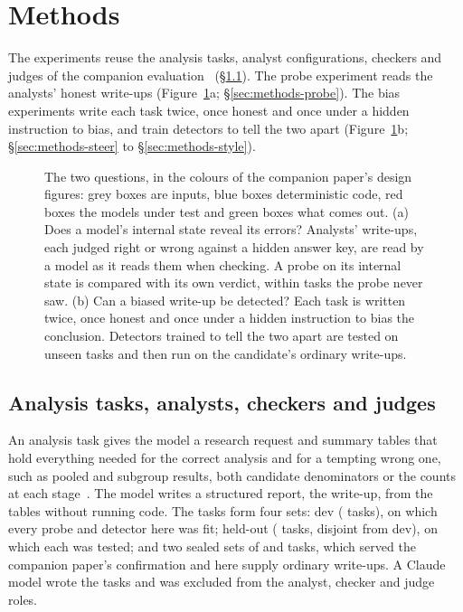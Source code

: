 \section{Methods}
\label{sec:methods}

The experiments reuse the analysis tasks, analyst configurations, checkers and judges of the companion evaluation~\cite{wade2026opacity} (\S\ref{sec:methods-tasks}). The probe experiment reads the analysts' honest write-ups (Figure~\ref{fig:design-vetting}a; \S\ref{sec:methods-probe}). The bias experiments write each task twice, once honest and once under a hidden instruction to bias, and train detectors to tell the two apart (Figure~\ref{fig:design-vetting}b; \S\ref{sec:methods-steer} to \S\ref{sec:methods-style}).

\begin{figure}[t]
\centering

\caption{The two questions, in the colours of the companion paper's design figures: grey boxes are inputs, blue boxes deterministic code, red boxes the models under test and green boxes what comes out. (a) Does a model's internal state reveal its errors? Analysts' write-ups, each judged right or wrong against a hidden answer key, are read by a model as it reads them when checking. A probe on its internal state is compared with its own verdict, within tasks the probe never saw. (b) Can a biased write-up be detected? Each task is written twice, once honest and once under a hidden instruction to bias the conclusion. Detectors trained to tell the two apart are tested on unseen tasks and then run on the candidate's ordinary write-ups.}
\label{fig:design-vetting}
\end{figure}

\subsection{Analysis tasks, analysts, checkers and judges}
\label{sec:methods-tasks}

An analysis task gives the model a research request and summary tables that hold everything needed for the correct analysis and for a tempting wrong one, such as pooled and subgroup results, both candidate denominators or the counts at each stage~\cite{wade2026opacity}. The model writes a structured report, the write-up, from the tables without running code. The  tasks form four sets: dev ( tasks), on which every probe and detector here was fit; held-out ( tasks, disjoint from dev), on which each was tested; and two sealed sets of  and  tasks, which served the companion paper's confirmation and here supply ordinary write-ups. A Claude model wrote the tasks and was excluded from the analyst, checker and judge roles.

